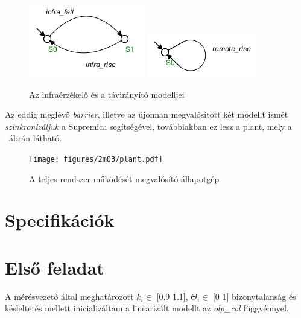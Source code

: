 \begin{figure}
	\centering
	\includegraphics[keepaspectratio]{figures/2m03/b_infra.png}	\includegraphics[keepaspectratio]{figures/2m03/b_remote.png}
	\caption{Az infraérzékelő és a távirányító modelljei}
	\label{fig:InfraRemote}
\end{figure}

Az eddig meglévő \textit{barrier}, illetve az újonnan megvalósított két modellt ismét \textit{szinkronizáljuk} a Supremica segítségével, továbbiakban ez lesz a plant, mely a ~ábrán látható.

\begin{figure}
	\centering
	\texttt{[image: figures/2m03/plant.pdf]}
	\caption{A teljes rendszer működését megvalósító állapotgép}
	\label{fig:Plant}
\end{figure}

\section{Specifikációk}


\newpage
\section{Első feladat}
A mérésvezető által meghatározott {$k_i \in$ [0.9 1.1], $\Theta_i \in$ [0 1]} bizonytalanság és késleltetés mellett inicializáltam a linearizált modellt az \textit{olp\_col} függvénnyel. 

